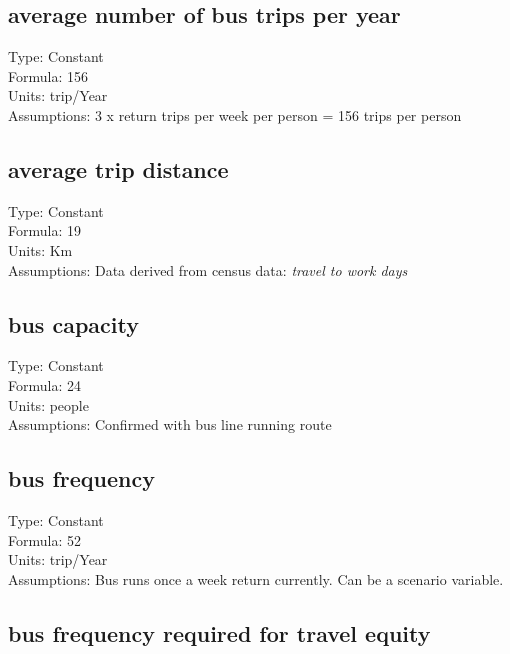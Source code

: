 \documentclass[
  11pt,
]{book}
\begin{document}
\hypertarget{average-number-of-bus-trips-per-year}{%
\subsection{average number of bus trips per year}\label{average-number-of-bus-trips-per-year}}

Type: Constant\\
Formula: 156\\
Units: trip/Year\\
Assumptions: 3 x return trips per week per person = 156 trips per person

\hypertarget{average-trip-distance}{%
\subsection{average trip distance}\label{average-trip-distance}}

Type: Constant\\
Formula: 19\\
Units: Km\\
Assumptions: Data derived from census data: \emph{travel to work days}

\hypertarget{bus-capacity}{%
\subsection{bus capacity}\label{bus-capacity}}

Type: Constant\\
Formula: 24\\
Units: people\\
Assumptions: Confirmed with bus line running route

\hypertarget{bus-frequency}{%
\subsection{bus frequency}\label{bus-frequency}}

Type: Constant\\
Formula: 52\\
Units: trip/Year\\
Assumptions: Bus runs once a week return currently. Can be a scenario variable.

\hypertarget{bus-frequency-required-for-travel-equity}{%
\subsection{bus frequency required for travel equity}\label{bus-frequency-required-for-travel-equity}}
\end{document}
